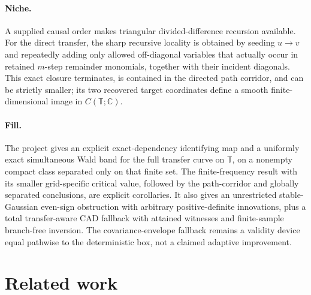 \documentclass{article}
\begin{document}
\paragraph{Niche.} A supplied causal order makes triangular divided-difference recursion available.  For the direct transfer, the sharp recursive locality is obtained by seeding \(u\to v\) and repeatedly adding only allowed off-diagonal variables that actually occur in retained \(m\)-step remainder monomials, together with their incident diagonals.  This exact closure terminates, is contained in the directed path corridor, and can be strictly smaller; its two recovered target coordinates define a smooth finite-dimensional image in \(C(\mathbb T;\mathbb C)\).

\paragraph{Fill.} The project gives an explicit exact-dependency identifying map and a uniformly exact simultaneous Wald band for the full transfer curve on \(\mathbb T\), on a nonempty compact class separated only on that finite set.  The finite-frequency result with its smaller grid-specific critical value, followed by the path-corridor and globally separated conclusions, are explicit corollaries.  It also gives an unrestricted stable-Gaussian even-sign obstruction with arbitrary positive-definite innovations, plus a total transfer-aware CAD fallback with attained witnesses and finite-sample branch-free inversion.  The covariance-envelope fallback remains a validity device equal pathwise to the deterministic box, not a claimed adaptive improvement.

\section{Related work}
\end{document}

